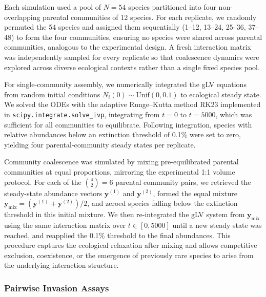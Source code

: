 Each simulation used a pool of $N = 54$ species partitioned into four non-overlapping parental communities of 12 species. For each replicate, we randomly permuted the 54 species and assigned them sequentially (1--12, 13--24, 25--36, 37--48) to form the four communities, ensuring no species were shared across parental communities, analogous to the experimental design. A fresh interaction matrix was independently sampled for every replicate so that coalescence dynamics were explored across diverse ecological contexts rather than a single fixed species pool.

For single-community assembly, we numerically integrated the gLV equations from random initial conditions $N_i(0) \sim \text{Unif}(0, 0.1)$ to ecological steady state. We solved the ODEs with the adaptive Runge--Kutta method RK23 implemented in \texttt{scipy.integrate.solve\_ivp}, integrating from $t = 0$ to $t = 5000$, which was sufficient for all communities to equilibrate. Following integration, species with relative abundances below an extinction threshold of 0.1\% were set to zero, yielding four parental-community steady states per replicate.

Community coalescence was simulated by mixing pre-equilibrated parental communities at equal proportions, mirroring the experimental 1:1 volume protocol. For each of the $\binom{4}{2} = 6$ parental community pairs, we retrieved the steady-state abundance vectors $\mathbf{y}^{(1)}$ and $\mathbf{y}^{(2)}$, formed the equal mixture $\mathbf{y}_{\text{mix}} = (\mathbf{y}^{(1)} + \mathbf{y}^{(2)})/2$, and zeroed species falling below the extinction threshold in this initial mixture. We then re-integrated the gLV system from $\mathbf{y}_{\text{mix}}$ using the same interaction matrix over $t \in [0, 5000]$ until a new steady state was reached, and reapplied the 0.1\% threshold to the final abundances. This procedure captures the ecological relaxation after mixing and allows competitive exclusion, coexistence, or the emergence of previously rare species to arise from the underlying interaction structure.


\subsubsection*{Pairwise Invasion Assays}
\label{sec:suppl:methods:invasion}


